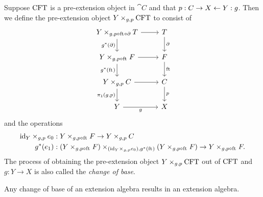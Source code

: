 \begin{defn}\label{cobesys}
Suppose $\mathrm{CFT}$ is a pre-extension object in $\cat{C}$ and that 
$p:C\rightarrow X\leftarrow Y:g$.
Then we define the pre-extension object $\cobesys{Y}{\stesys}{g}{p}$ to consist of
\begin{equation*}
\begin{tikzcd}
\cobesys{Y}{\stesyst}{g}{p\circ\eft\circ\ebd}
  \ar{r}
  \ar{d}[swap]{g^\ast(\ebd)}
  &
\stesyst
  \ar{d}{\ebd}
  \\
\cobesys{Y}{\stesysf}{g}{p\circ\eft}
  \ar{r}
  \ar{d}[swap]{g^\ast(\eft)}
  &
\stesysf
  \ar{d}{\eft}
  \\
\cobesys{Y}{\stesysc}{g}{p}
  \ar{r}
  \ar{d}[swap]{\pullbackpr{1}{g}{p}}
  &
\stesysc
  \ar{d}{p}
  \\
Y \ar{r}[swap]{g}
  &
X
\end{tikzcd}
\end{equation*} 
and the operations
\begin{align*}
\pullback{\catid{Y}}{\ectxext}{g}{p} 
  & : \pullback{Y}{\stesysf}{g}{p\circ\eft}\to \pullback{Y}{\stesysc}{g}{p}\\
g^\ast(\efamext) & : 
  \pullback
    {\pullback{Y}{\stesysf}{g}{p\circ\eft}}
    {\pullback{Y}{\stesysf}{g}{p\circ\eft}}
    {\pullback{\catid{Y}}{\ectxext}{g}{p}}
    {g^\ast(\eft)}
  \to 
  \pullback{Y}{\stesysf}{g}{p\circ\eft}.
\end{align*}
The process of obtaining the pre-extension object $\cobesys{Y}{\stesys}{g}{p}$ out of $\mathrm{CFT}$
and $g:Y\to X$ is also called the \emph{change of base}.
\end{defn}

\begin{lem}
Any change of base of an extension algebra results in an extension algebra.
\end{lem}

